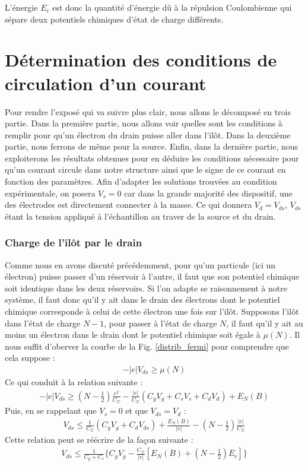 L'énergie $E_c$ est donc la quantité d'énergie d\^u à la répulsion Coulombienne qui sépare deux potentiels chimiques d'état de charge différents.


\section{Détermination des conditions de circulation d'un courant}
Pour rendre l'exposé qui va suivre plus clair, nous allons le décomposé en trois partie. Dans la première partie, nous allons voir quelles sont les conditions à remplir pour qu'un électron du drain puisse aller dans l'il\^ot. Dans la deuxième partie, nous ferrons de m\^eme pour la source. Enfin, dans la dernière partie, nous exploiterons les résultats obtenues pour en déduire les conditions nécessaire pour qu'un courant circule dans notre structure ainsi que le signe de ce courant en fonction des paramètres. Afin d'adapter les solutions trouvées au condition expérimentale, on posera $V_s = 0$ car dans la grande majorité des dispositif, une des électrodes est directement connecter à la masse. Ce qui donnera $V_d=V_{ds}$, $V_{ds}$ étant la tension appliqué à l'échantillon au traver de la source et du drain.

\subsubsection{Charge de l'il\^ot par le drain}
Comme nous en avons discuté précédemment, pour qu'un particule (ici un électron) puisse passer d'un réservoir à l'autre, il faut que son potentiel chimique soit identique dans les deux réservoirs. Si l'on adapte se raisonnement à notre système, il faut donc qu'il y ait dans le drain des électrons dont le potentiel chimique corresponde à celui de cette électron une fois sur l'il\^ot. Supposons l'il\^ot dans l'état de charge $N-1$, pour passer à l'état de charge $N$, il faut qu'il y ait au moins un électron dans le drain dont le potentiel chimique soit égale à $\mu(N)$. Il nous suffit d'oberver la courbe de la Fig. \ref{distrib_fermi} pour comprendre que cela suppose :
\begin{eqnarray}
-|e|V_{ds} \geq \mu(N)
\end{eqnarray}
Ce qui conduit à la relation suivante :
\begin{eqnarray}
-|e|V_{ds} \geq (N-\frac{1}{2})\frac{e^2}{C_{\Sigma}}
-
\frac{|e|}{C_{\Sigma}}(C_gV_g + C_sV_s + C_dV_d)
+
E_N(B) \nonumber
\end{eqnarray}
Puis, en se rappelant que $V_s= 0$ et que $V_{ds} = V_d$ :
\begin{eqnarray}
V_{ds} \leq \frac{1}{C_{\Sigma}}(C_gV_g + C_dV_{ds}) + \frac{E_N(B)}{|e|} - (N-\frac{1}{2})\frac{|e|}{C_{\Sigma}} \nonumber
\end{eqnarray}
Cette relation peut se réécrire de la façon suivante :
\begin{eqnarray}
V_{ds} \leq \frac{1}{C_g + C_s} \{C_gV_g - \frac{C_{\Sigma}}{|e|}[E_N(B) + (N-\frac{1}{2})E_c] \}
\end{eqnarray}

